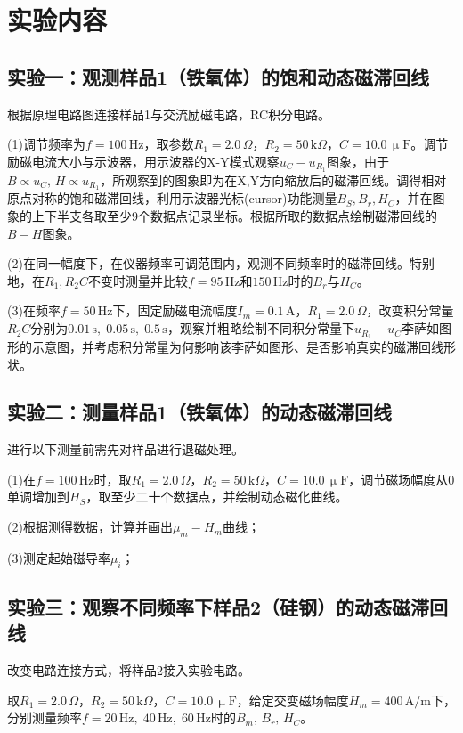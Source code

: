 \documentclass[UTF-8,twoside,cs4size]{ctexart}
\begin{document}
	\section{实验内容}
	\subsection{实验一：观测样品1（铁氧体）的饱和动态磁滞回线}
	根据原理电路图连接样品1与交流励磁电路，RC积分电路。
	
	(1)调节频率为$ f=100\,\mathrm{Hz} $，取参数$ R_1=2.0\,\Omega $，$ R_2=50\,\mathrm k\Omega $，$ C=10.0\,\upmu\mathrm F $。调节励磁电流大小与示波器，用示波器的X-Y模式观察$ u_C-u_{R_1} $图象，由于$ B\propto u_C,\,H\propto u_{R_1} $，所观察到的图象即为在X,Y方向缩放后的磁滞回线。调得相对原点对称的饱和磁滞回线，利用示波器光标(cursor)功能测量$ B_S,B_r,H_C $，并在图象的上下半支各取至少9个数据点记录坐标。根据所取的数据点绘制磁滞回线的$ B-H $图象。
	
	(2)在同一幅度下，在仪器频率可调范围内，观测不同频率时的磁滞回线。特别地，在$ R_1,R_2C $不变时测量并比较$ f=95\,\mathrm{Hz} $和$ 150\,\mathrm{Hz} $时的$ B_r $与$ H_C $。
	
	(3)在频率$ f=50\,\mathrm{Hz} $下，固定励磁电流幅度$ I_m=0.1\,\mathrm A $，$ R_1=2.0\,\Omega $，改变积分常量$ R_2C $分别为$ 0.01\,\mathrm s,\;0.05\,\mathrm s,\;0.5\,\mathrm s $，观察并粗略绘制不同积分常量下$ u_{R_1}-u_C $李萨如图形的示意图，并考虑积分常量为何影响该李萨如图形、是否影响真实的磁滞回线形状。
	\subsection{实验二：测量样品1（铁氧体）的动态磁滞回线}
	进行以下测量前需先对样品进行退磁处理。
	
	(1)在$ f=100\,\mathrm{Hz} $时，取$ R_1=2.0\,\Omega $，$ R_2=50\,\mathrm k\Omega $，$ C=10.0\,\upmu\mathrm F $，调节磁场幅度从$ 0 $单调增加到$ H_S $，取至少二十个数据点，并绘制动态磁化曲线。
	
	(2)根据测得数据，计算并画出$ \mu_m-H_m $曲线；
	
	(3)测定起始磁导率$ \mu_i $；
	\subsection{实验三：观察不同频率下样品2（硅钢）的动态磁滞回线}
	改变电路连接方式，将样品2接入实验电路。
	
	取$ R_1=2.0\,\Omega $，$ R_2=50\,\mathrm k\Omega $，$ C=10.0\,\upmu\mathrm F $，给定交变磁场幅度$ H_m=400\,\mathrm{A/m} $下，分别测量频率$ f=20\,\mathrm{Hz},\;40\,\mathrm{Hz},\;60\,\mathrm{Hz} $时的$ B_m,\,B_r,\,H_C $。
\end{document}
